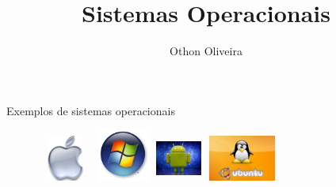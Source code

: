 \documentclass[11pt]{beamer}
\author{Othon Oliveira}
\title{Sistemas Operacionais}
\institute{Fatec -- Faculdade de Informática --- PE}
\begin{document}
\newcommand{\capa}{
    \begin{tikzpicture}[remember picture,overlay]
        \node at (current page.south west)
            {\begin{tikzpicture}[remember picture, overlay]
                \fill[shading=radial,top color=orange,bottom color=orange,middle color=yellow] (0,0) rectangle (\paperwidth,\paperheight);
            \end{tikzpicture}
          };
    \end{tikzpicture}
}


\begin{frame}
\titlepage
\end{frame}




\begin{frame}{Exemplos de sistemas operacionais}
\begin{figure}[h]
\includegraphics[width=18mm, height=15mm]{Figuras/appleOficial.jpg}
\qquad \quad \quad \quad \quad
\includegraphics[width=19mm, height=17mm]{Figuras/windows.png}
\qquad \quad \quad \quad \quad \quad \quad 	\vspace{1.0in}
\includegraphics[width=15mm, height=15mm]{Figuras/android.jpg}
\qquad \quad \quad \quad \quad \quad \quad \quad 
\includegraphics[width=25mm, height=15mm]{Figuras/ubuntu_904.jpg}

\end{figure}
\end{frame}
\end{document}
